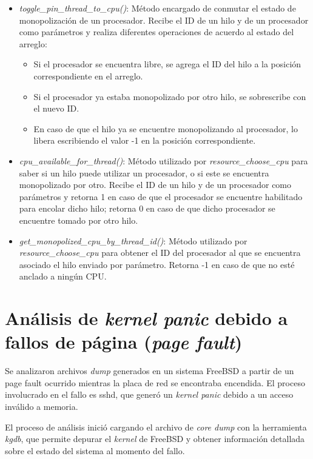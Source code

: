 \begin{itemize}
    \item \textit{toggle\_pin\_thread\_to\_cpu()}: Método encargado de conmutar el estado de monopolización de un procesador. Recibe el ID de un hilo y de un procesador como parámetros y realiza diferentes operaciones de acuerdo al estado del arreglo:
          \begin{itemize}
              \item Si el procesador se encuentra libre, se agrega el ID del hilo a la posición correspondiente en el arreglo.
              \item Si el procesador ya estaba monopolizado por otro hilo, se sobrescribe con el nuevo ID.
              \item En caso de que el hilo ya se encuentre monopolizando al procesador, lo libera escribiendo el valor -1 en la posición correspondiente.
          \end{itemize}
    \item \textit{cpu\_available\_for\_thread()}: Método utilizado por \textit{resource\_choose\_cpu} para saber si un hilo puede utilizar un procesador, o si este se encuentra monopolizado por otro. Recibe el ID de un hilo y de un procesador como parámetros y retorna 1 en caso de que el procesador se encuentre habilitado para encolar dicho hilo; retorna 0 en caso de que dicho procesador se encuentre tomado por otro hilo.
    \item \textit{get\_monopolized\_cpu\_by\_thread\_id()}: Método utilizado por \textit{resource\_choose\_cpu} para obtener el ID del procesador al que se encuentra asociado el hilo enviado por parámetro. Retorna -1 en caso de que no esté anclado a ningún CPU.\par
\end{itemize}

\section{Análisis de \textit{kernel panic} debido a fallos de página (\textit{page fault})}\label{appendix:apC}

Se analizaron archivos \textit{dump} generados en un sistema FreeBSD a partir de un page fault ocurrido mientras la placa de red se encontraba encendida. El proceso involucrado en el fallo es sshd, que generó un \textit{kernel panic} debido a un acceso inválido a memoria.

El proceso de análisis inició cargando el archivo de \textit{core dump} con la herramienta \textit{kgdb}, que permite depurar el \textit{kernel} de FreeBSD y obtener información detallada sobre el estado del sistema al momento del fallo.

